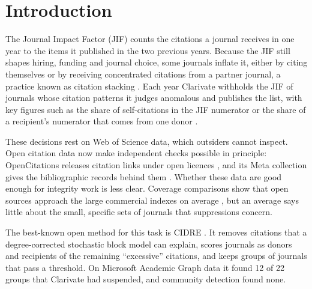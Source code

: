 \section{Introduction}\label{sec:intro}

The Journal Impact Factor (JIF) counts the citations a journal receives in one year to the items it published in the
two previous years. Because the JIF still shapes hiring, funding and journal choice, some journals inflate it, either
by citing themselves or by receiving concentrated citations from a partner journal, a practice known as citation
stacking \citep{heneberg2016stacking,vannoorden2013brazil,wilhite2012coercive,chorus2016coercive}. Each year Clarivate
withholds the JIF of journals whose citation patterns it judges anomalous and publishes the list, with key figures
such as the share of self-citations in the JIF numerator or the share of a recipient's numerator that comes from one
donor \citep{moussa2022suppressed,taskin2021selfcitation}.

These decisions rest on Web of Science data, which outsiders cannot inspect. Open citation data now make independent
checks possible in principle: OpenCitations releases citation links under open licences
\citep{peroni2020opencitations,heibi2019coci}, and its Meta collection gives the bibliographic records behind them
\citep{massari2024meta}. Whether these data are good enough for integrity work is less clear. Coverage comparisons
show that open sources approach the large commercial indexes on average
\citep{martinmartin2021coverage,visser2021comparison,culbert2025openalex}, but an average says little about the small,
specific sets of journals that suppressions concern.

The best-known open method for this task is CIDRE \citep{kojaku2021cidre}. It removes citations that a degree-corrected
stochastic block model can explain, scores journals as donors and recipients of the remaining ``excessive''
citations, and keeps groups of journals that pass a threshold. On Microsoft Academic Graph data it found 12 of 22
groups that Clarivate had suspended, and community detection found none.

